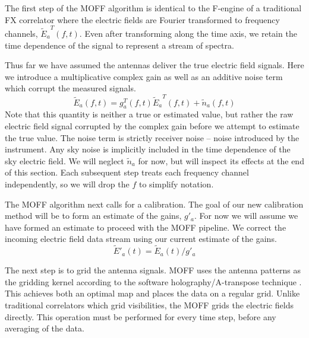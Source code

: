 \documentclass[a4paper,fleqn,usenatbib]{mnras}
\newcommand{\Er}[1]{\ensuremath{\widetilde{E}_{#1}}}
\newcommand{\Erest}[1]{\ensuremath{\widetilde{E}'_{#1}}}
\begin{document}
The first step of the MOFF algorithm is identical to the F-engine of a traditional FX correlator where the electric fields are Fourier transformed to frequency channels, $\Er{a}^T(f,t)$. Even after transforming along the time axis, we retain the time dependence of the signal to represent a stream of spectra.

Thus far we have assumed the antennas deliver the true electric field signals. Here we introduce a multiplicative complex gain as well as an additive noise term which corrupt the measured signals.
\begin{equation}\label{eq:apply_gain}
\Er{a}(f,t) = g^T_a(f,t) \Er{a}^T(f,t) + \widetilde{n}_a(f,t)
\end{equation}
Note that this quantity is neither a true or estimated value, but rather the raw electric field signal corrupted by the complex gain before we attempt to estimate the true value. The noise term is strictly receiver noise -- noise introduced by the instrument. Any sky noise is implicitly included in the time dependence of the sky electric field. We will neglect $\widetilde{n}_a$ for now, but will inspect its effects at the end of this section. Each subsequent step treats each frequency channel independently, so we will drop the $f$ to simplify notation. 

The MOFF algorithm next calls for a calibration. The goal of our new calibration method will be to form an estimate of the gains, $g'_a$. For now we will assume we have formed an estimate to proceed with the MOFF pipeline. We correct the incoming electric field data stream using our current estimate of the gains.
\begin{equation}
\Erest{a}(t) = \Er{a}(t)/ g'_a
\end{equation}

The next step is to grid the antenna signals. MOFF uses the antenna patterns as the gridding kernel according to the software holography/A-transpose technique \citep{mor09,bha08}. This achieves both an optimal map \citep{teg97b} and places the data on a regular grid. Unlike traditional correlators which grid visibilities, the MOFF grids the electric fields directly. This operation must be performed for every time step, before any averaging of the data.
\end{document}

